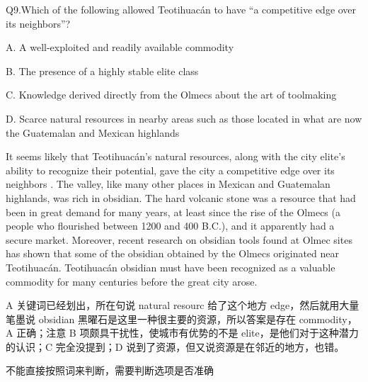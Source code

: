 \begin{blk}
    \begin{qst}
        Q9.Which of the following allowed Teotihuacán to have “a competitive edge over its neighbors”?
    \end{qst}

    \begin{chc}
        A. A well-exploited and readily available commodity

        B. The presence of a highly stable elite class

        C. Knowledge derived directly from the Olmecs about the art of toolmaking

        D. Scarce natural resources in nearby areas such as those located in what are now the Guatemalan and Mexican highlands
    \end{chc}

    \begin{psgq}
        It seems likely that Teotihuacán’s natural resources, along with the city elite’s ability to recognize their potential, gave the city a competitive edge over its neighbors . The valley, like many other places in Mexican and Guatemalan highlands, was rich in obsidian. The hard volcanic stone was a resource that had been in great demand for many years, at least since the rise of the Olmecs (a people who flourished between 1200 and 400 B.C.), and it apparently had a secure market. Moreover, recent research on obsidian tools found at Olmec sites has shown that some of the obsidian obtained by the Olmecs originated near Teotihuacán. Teotihuacán obsidian must have been recognized as a valuable commodity for many centuries before the great city arose.
    \end{psgq}

    \begin{nlz}
        A 关键词已经划出，所在句说 natural resourc 给了这个地方 edge，然后就用大量笔墨说 obsidian 黑曜石是这里一种很主要的资源，所以答案是存在 commodity，A 正确；注意 B 项颇具干扰性，使城市有优势的不是 elite，是他们对于这种潜力的认识；C 完全没提到；D 说到了资源，但又说资源是在邻近的地方，也错。

        不能直接按照词来判断，需要判断选项是否准确
    \end{nlz}
\end{blk}

